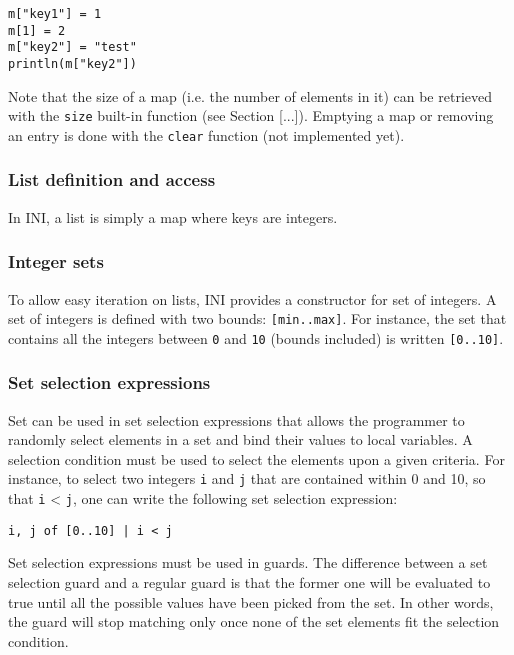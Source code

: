 \documentclass[11pt]{article}
\begin{document}
\begin{lstlisting}
m["key1"] = 1
m[1] = 2
m["key2"] = "test"
println(m["key2"])
\end{lstlisting}

Note that the size of a map (i.e. the number of elements in it) can be retrieved with the \texttt{size} built-in function (see Section [...]).  Emptying a map or removing an entry is done with the \texttt{clear} function (not implemented yet).

\subsubsection{List definition and access}

In INI, a list is simply a map where keys are integers.

\subsubsection{Integer sets}

To allow easy iteration on lists, INI provides a constructor for set of integers. A set of integers is defined with two bounds: \texttt{[min..max]}. For instance, the set that contains all the integers between \texttt{0} and \texttt{10} (bounds included) is written \texttt{[0..10]}.

\subsubsection{Set selection expressions\label{subsubsec:setselectionexpressions}}

Set can be used in set selection expressions that allows the programmer to randomly select elements in a set and bind their values to local variables. A selection condition must be used to select the elements upon a given criteria. For instance, to select two integers \texttt{i} and \texttt{j} that are contained within 0 and 10, so that \texttt{i} < \texttt{j}, one can write the following set selection expression:

\begin{lstlisting}[numbers=none]
i, j of [0..10] | i < j
\end{lstlisting}

Set selection expressions must be used in guards. The difference between a set selection guard and a regular guard is that the former one will be evaluated to true until all the possible values have been picked from the set. In other words, the guard will stop matching only once none of the set elements fit the selection condition.
\end{document}

